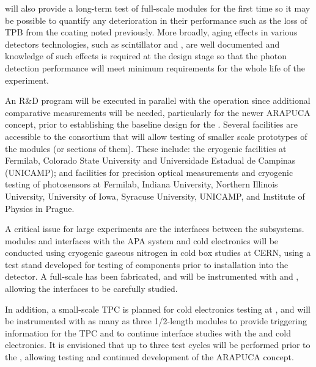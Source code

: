  will also provide a long-term test of full-scale  modules for the first time so it may be possible to quantify any deterioration in their performance such as the loss of TPB from the coating noted previously. 
More broadly, aging effects in various detectors technologies, such as scintillator and , are well documented and knowledge of such effects is required at the design stage so that the photon detection performance will meet minimum requirements for the whole life of the experiment.

An R\&D program will be executed in parallel with the  operation since additional comparative measurements will be needed, particularly for the newer ARAPUCA concept, prior to establishing the baseline design for the .
Several facilities are accessible to the consortium that will allow testing of smaller scale prototypes of the modules (or sections of them). 
These include: the cryogenic facilities 
at Fermilab,  Colorado State University and Universidade Estadual de Campinas (UNICAMP); and facilities for precision optical measurements and cryogenic testing of photosensors at Fermilab, Indiana University, Northern Illinois University, University of Iowa, Syracuse University, UNICAMP, and Institute of Physics in Prague. 


A critical issue for large experiments are the interfaces between the subsystems.  modules and interfaces with the APA system and cold electronics will be conducted using cryogenic gaseous nitrogen in cold box studies at CERN, using a test stand developed for testing of  components prior to installation into the detector.  A full-scale   has been fabricated, 
and will be instrumented with  and , allowing the interfaces to be carefully studied.

In addition, a small-scale TPC is planned for cold electronics testing at , and will be instrumented with as many as three 1/2-length  modules to provide triggering information for the TPC and to continue interface studies with the  and cold electronics.  It is envisioned that up to three test cycles will be performed prior to the , allowing testing and continued development of the ARAPUCA concept.

